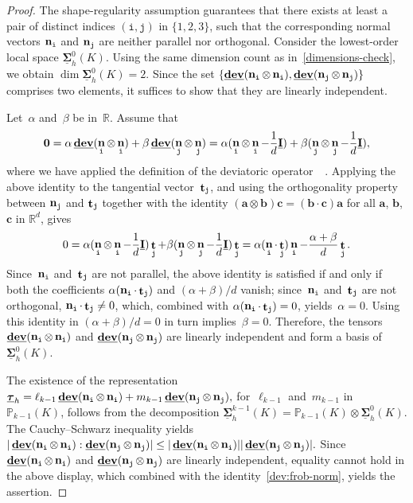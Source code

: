 \documentclass[a4paper,twoside,10pt]{article}
\theoremstyle{plain}
\theoremstyle{remark}
\theoremstyle{definition}
\numberwithin{equation}{section}
\numberwithin{figure}{section}
\newcommand{\Pbbkmo}{\mathbb{P}_{k-1}}
\newcommand{\Rbb}{\mathbb{R}}
\newcommand{\Rbbd}{\mathbb{R}^d}
\newcommand{\K}{K}
\newcommand{\Sigmah}{\underline{\boldsymbol{\Sigma}}_h}
\newcommand{\Sigmahz}{\Sigmah^0}
\newcommand{\Sigmahkmo}{\Sigmah^{k-1}}
\newcommand{\taubfh}{\underline{\boldsymbol{\tau}}_h}
\DeclareMathOperator{\dev}{\underline{\mathbf{dev}}}
\DeclareMathOperator{\norm}{\bf{n}}
\DeclareMathOperator{\tang}{\bf{t}}
\newcommand{\bbf}{\mathbf{b}}
\newcommand{\zerobf}{\mathbf{0}}
\newcommand{\lkmo}{\ell_{k-1}}
\newcommand{\mkmo}{m_{k-1}}
\newcommand{\itt}{\mathtt{i}}
\newcommand{\jtt}{\mathtt{j}}
\newcommand{\normitt}{\norm_{\itt}}
\newcommand{\normjtt}{\norm_{\jtt}}
\newcommand{\tangjtt}{\tang_{\jtt}}
\newcommand{\Idbf}{\underline{\mathbf{I}}}
\newcommand{\abf}{\mathbf{a}}
\newcommand{\cbf}{\mathbf{c}}
\begin{document}
\begin{proof}
The shape-regularity assumption guarantees that
there exists at least a pair of distinct indices $(\itt,\jtt)$ in $\{1,2,3\}$,
such that the corresponding normal vectors $\normitt$ and $\normjtt$
are neither parallel nor orthogonal.
Consider the lowest-order local space $\Sigmahz(\K)$.
Using the same dimension count as in~\eqref{dimensions-check},
we obtain $\dim \Sigmahz(\K) = 2$.
Since the set $\{\dev(\normitt\otimes\normitt),\dev(\normjtt\otimes\normjtt)\}$
comprises two elements,
it suffices to show that they are linearly independent.

Let~$\alpha$ and~$\beta$ be in~$\Rbb$.
Assume that
\begin{equation*}
\zerobf
= \alpha\dev(\normitt\otimes\normitt) + \beta \dev(\normjtt\otimes\normjtt)
= \alpha(\normitt\otimes\normitt - \frac{1}{d}\Idbf) + \beta(\normjtt\otimes\normjtt - \frac{1}{d}\Idbf),
\end{equation*}
where we have applied the definition of the deviatoric operator~$\dev$.
Applying the above identity to the tangential vector~$\tangjtt$,
and using the orthogonality property between $\normjtt$ and $\tangjtt$
together with the identity
$(\abf\otimes\bbf)\cbf = (\bbf \cdot \cbf)\abf$
for all $\abf$, $\bbf$, $\cbf$ in $\Rbbd$,
gives
\begin{equation*} \label{alpha-beta-basisn1n2}
\begin{split}
0
= \alpha(\normitt\otimes\normitt - \frac{1}{d}\Idbf)\tangjtt + \beta(\normjtt\otimes\normjtt - \frac{1}{d}\Idbf)\tangjtt
= \alpha(\normitt \cdot \tangjtt)\normitt - \frac{\alpha+\beta}{d}\tangjtt.
\end{split}
\end{equation*}
Since~$\normitt$ and~$\tangjtt$ are not parallel,
the above identity is satisfied if and only if both the coefficients
$\alpha(\normitt \cdot \tangjtt)$
and
$(\alpha+\beta)/d$
vanish;
since~$\normitt$ and~$\tangjtt$ are not orthogonal,
$\normitt \cdot \tangjtt \neq 0$,
which,
combined with $\alpha(\normitt \cdot \tangjtt)=0$,
yields~$\alpha = 0$.
Using this identity in $(\alpha+\beta)/d = 0$
in turn implies~$\beta = 0$.
Therefore,
the tensors $\dev(\normitt\otimes\normitt)$ and $\dev(\normjtt\otimes\normjtt)$
are linearly independent and form a basis of~$\Sigmahz(\K)$.

The existence of the representation
$
\taubfh = \lkmo \dev(\normitt\otimes\normitt) + \mkmo \dev(\normjtt\otimes\normjtt),
$
for~$\lkmo$ and~$\mkmo$ in~$\Pbbkmo(\K)$,
follows from the decomposition
$
\Sigmahkmo(\K) = \Pbbkmo(\K)\otimes\Sigmahz(\K).
$
The Cauchy--Schwarz inequality yields
$
|\dev(\normitt\otimes\normitt):\dev(\normjtt\otimes\normjtt)|
\leq |\dev(\normitt\otimes\normitt)||\dev(\normjtt\otimes\normjtt)|.
$
Since
$\dev(\normitt\otimes\normitt)$ and $\dev(\normjtt\otimes\normjtt)$
are linearly independent,
equality cannot hold in the above display,
which combined with the identity~\eqref{dev:frob-norm},
yields the assertion.
\end{proof}
\end{document}
